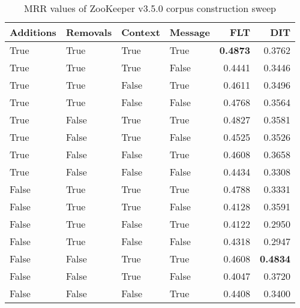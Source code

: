 
\begin{table}
\begin{spacing}{1.2}
\centering
\caption{MRR values of ZooKeeper v3.5.0 corpus construction sweep}
\label{table:zookeeper_corpus_sweep}
\vspace{0.2em}
\begin{tabular}{llll|rr}
\toprule
Additions & Removals & Context & Message & FLT &       DIT \\
\midrule
     True &     True &    True &    True &     {\bf 0.4873} &       0.3762 \\
     True &     True &    True &   False &           0.4441 &       0.3446 \\
     True &     True &   False &    True &           0.4611 &       0.3496 \\
     True &     True &   False &   False &           0.4768 &       0.3564 \\
     True &    False &    True &    True &           0.4827 &       0.3581 \\
     True &    False &    True &   False &           0.4525 &       0.3526 \\
     True &    False &   False &    True &           0.4608 &       0.3658 \\
     True &    False &   False &   False &           0.4434 &       0.3308 \\
    False &     True &    True &    True &           0.4788 &       0.3331 \\
    False &     True &    True &   False &           0.4128 &       0.3591 \\
    False &     True &   False &    True &           0.4122 &       0.2950 \\
    False &     True &   False &   False &           0.4318 &       0.2947 \\
    False &    False &    True &    True &           0.4608 & {\bf 0.4834} \\
    False &    False &    True &   False &           0.4047 &       0.3720 \\
    False &    False &   False &    True &           0.4408 &       0.3400 \\
\bottomrule
\end{tabular}

\end{spacing}
\end{table}
